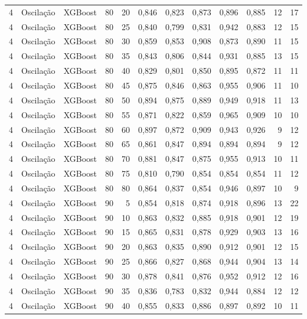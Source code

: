 \begin{longtable}{@{}rllrrrrrrrrr@{}}
4 & Oscilação & XGBoost & 80 & 20 & 0,846 & 0,823 & 0,873 & 0,896 & 0,885 & 12 & 17 \\
4 & Oscilação & XGBoost & 80 & 25 & 0,840 & 0,799 & 0,831 & 0,942 & 0,883 & 12 & 15 \\
4 & Oscilação & XGBoost & 80 & 30 & 0,859 & 0,853 & 0,908 & 0,873 & 0,890 & 11 & 15 \\
4 & Oscilação & XGBoost & 80 & 35 & 0,843 & 0,806 & 0,844 & 0,931 & 0,885 & 13 & 15 \\
4 & Oscilação & XGBoost & 80 & 40 & 0,829 & 0,801 & 0,850 & 0,895 & 0,872 & 11 & 11 \\
4 & Oscilação & XGBoost & 80 & 45 & 0,875 & 0,846 & 0,863 & 0,955 & 0,906 & 11 & 10 \\
4 & Oscilação & XGBoost & 80 & 50 & 0,894 & 0,875 & 0,889 & 0,949 & 0,918 & 11 & 13 \\
4 & Oscilação & XGBoost & 80 & 55 & 0,871 & 0,822 & 0,859 & 0,965 & 0,909 & 10 & 10 \\
4 & Oscilação & XGBoost & 80 & 60 & 0,897 & 0,872 & 0,909 & 0,943 & 0,926 & 9 & 12 \\
4 & Oscilação & XGBoost & 80 & 65 & 0,861 & 0,847 & 0,894 & 0,894 & 0,894 & 9 & 12 \\
4 & Oscilação & XGBoost & 80 & 70 & 0,881 & 0,847 & 0,875 & 0,955 & 0,913 & 10 & 11 \\
4 & Oscilação & XGBoost & 80 & 75 & 0,810 & 0,790 & 0,854 & 0,854 & 0,854 & 11 & 12 \\
4 & Oscilação & XGBoost & 80 & 80 & 0,864 & 0,837 & 0,854 & 0,946 & 0,897 & 10 & 9 \\
4 & Oscilação & XGBoost & 90 & 5 & 0,854 & 0,818 & 0,874 & 0,918 & 0,896 & 13 & 22 \\
4 & Oscilação & XGBoost & 90 & 10 & 0,863 & 0,832 & 0,885 & 0,918 & 0,901 & 12 & 19 \\
4 & Oscilação & XGBoost & 90 & 15 & 0,865 & 0,831 & 0,878 & 0,929 & 0,903 & 13 & 16 \\
4 & Oscilação & XGBoost & 90 & 20 & 0,863 & 0,835 & 0,890 & 0,912 & 0,901 & 12 & 15 \\
4 & Oscilação & XGBoost & 90 & 25 & 0,866 & 0,827 & 0,868 & 0,944 & 0,904 & 13 & 14 \\
4 & Oscilação & XGBoost & 90 & 30 & 0,878 & 0,841 & 0,876 & 0,952 & 0,912 & 12 & 16 \\
4 & Oscilação & XGBoost & 90 & 35 & 0,836 & 0,783 & 0,832 & 0,944 & 0,884 & 12 & 12 \\
4 & Oscilação & XGBoost & 90 & 40 & 0,855 & 0,833 & 0,886 & 0,897 & 0,892 & 10 & 11 \\

\end{longtable}
